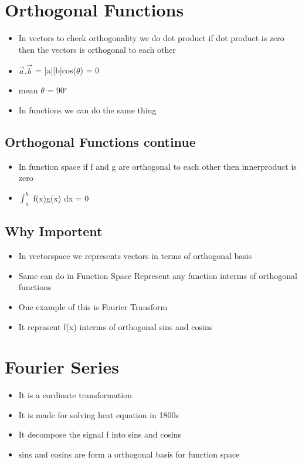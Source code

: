 \documentclass[11pt]{article}
\begin{document}
\section{Orthogonal Functions}
\label{sec:org2a83b2d}
\begin{itemize}
\item In vectors to check orthogonality we do dot product if dot product is zero then the vectors is orthogonal to each other
\item \(\vec a.\vec b\) = |a||b|cos(\(\theta\)) = 0
\item mean \(\theta\) = 90\(^{\circ}\)
\item In functions we can do the same thing
\end{itemize}
\subsection{Orthogonal Functions continue}
\label{sec:org5a4197e}
\begin{itemize}
\item In function space if f and g are orthogonal to each other then innerproduct is zero
\item \(\int_a^{b}\) f(x)g(x) dx = 0
\end{itemize}
\subsection{Why Importent}
\label{sec:org3baff67}
\begin{itemize}
\item In vectorspace we represents vectors in terms of orthogonal basis
\item Same can do in Function Space Represent any function interms of orthogonal functions
\item One example of this is Fourier Transform
\item It reprasent f(x) interms of orthogonal sins and cosins
\end{itemize}
\section{Fourier Series}
\label{sec:orgbdce917}
\begin{itemize}
\item It is a cordinate transformation
\item It is made for solving heat equation in 1800s
\item It decompose the signal f into sins and cosins
\item sins and cosins are form a orthogonal basis for function space
\end{itemize}
\end{document}
